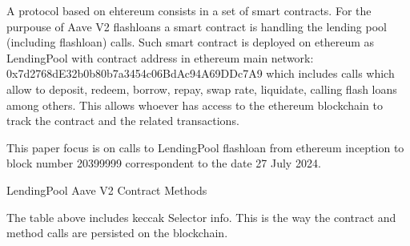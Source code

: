 \documentclass[11pt,a4paper,titlepage]{scrartcl}
\begin{document}
A protocol based on ehtereum consists in a set of smart contracts. For the purpouse of Aave V2 flashloans a smart contract is handling the lending pool (including flashloan) calls. Such smart contract  is deployed on ethereum  as LendingPool  with contract address in ethereum main network: 0x7d2768dE32b0b80b7a3454c06BdAc94A69DDc7A9 which  includes calls which allow to deposit, redeem, borrow, repay, swap rate, liquidate, calling flash loans among others. This allows whoever has access to the ethereum blockchain to track the contract and the related transactions.

This paper  focus is on calls to LendingPool flashloan from ethereum inception to block number 20399999 correspondent to the date 27 July 2024.

\begin{table}[ht]
\centering
\caption{LendingPool Aave V2 Contract Methods}
\caption*{\footnotesize This table summarizes key methods of the Aave V2 LendingPool contract, including their Keccak-encoded selectors.}
\label{tab:lendingpool_methods}
\end{table}

The table above includes keccak Selector info. This is the way the contract and method calls  are persisted on the blockchain.
\end{document}
